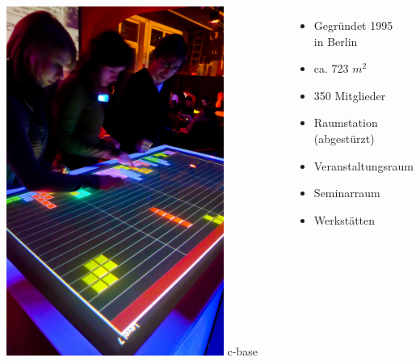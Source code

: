 \documentclass[aspectratio=43]{beamer}
\begin{document}
  \begin{frame}
    \begin{columns}[l]
      \includegraphics[width=0.8\textwidth]{multitouch-tetris.jpg}
      c-base
      \begin{itemize}
        \item Gegründet 1995\\in Berlin
        \item ca. 723 $m^2$
        \item 350 Mitglieder
        \item Raumstation (abgestürzt)
        \item Veranstaltungsraum
        \item Seminarraum
        \item Werkstätten
      \end{itemize}
    \end{columns}
  \end{frame}
\end{document}
